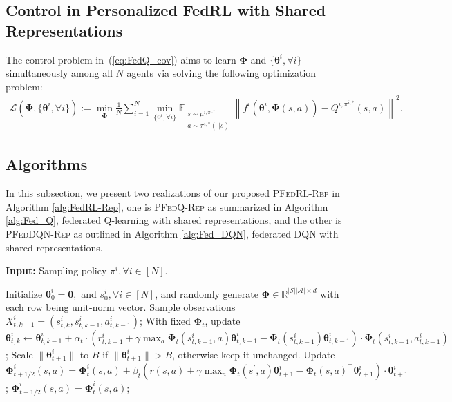 \documentclass{article} %
\def\eqref#1{equation~\ref{#1}}
\theoremstyle{plain}
\theoremstyle{definition}
\theoremstyle{remark}
\renewcommand{\eqref}[1]{(\ref{#1})}
\newcommand{\cB}{\mathcal{B}}
\newcommand{\cA}{\mathcal{A}}
\newcommand{\cS}{\mathcal{S}}
\newcommand{\cL}{\mathcal{L}}
\newcommand{\cC}{\mathcal{C}}
\newcommand{\cD}{\mathcal{D}}
\def\cA{{\mathcal{A}}} \def\cB{{\mathcal{B}}} \def\cC{{\mathcal{C}}} \def\cD{{\mathcal{D}}}
\newcommand{\FedRL}{\textsc{PFedRL-Rep}\xspace}
\begin{document}
{\subsection{Control in Personalized FedRL with Shared Representations}

The control problem in~\eqref{eq:FedQ_cov} aims to learn $\pmb{\Phi}$ and $\{\pmb{\theta}^i,\forall i\}$ simultaneously among all $N$ agents via solving the following optimization problem: 
\begin{align}
\cL(\pmb{\Phi}, \{\pmb{\theta}^i, \forall i\}) := \min_{\pmb{\Phi}} \frac{1}{N}\sum_{i=1}^N \min_{\{\pmb{\theta}^i,\forall i\}} \mathbb{E}_{\substack{s\sim\mu^{i,\pi^{i,*}}\\a\sim\pi^{i,*}(\cdot|s)}}\left\|f^i(\pmb{\theta}^i, \pmb{\Phi}(s,a))-Q^{i,\pi^{i,*}}(s,a)\right\|^2.
\end{align} 

\subsection{Algorithms}\label{alg:app}

In this subsection, we present two realizations of our proposed \FedRL in Algorithm \ref{alg:FedRL-Rep},
one is \textsc{PFedQ-Rep} as summarized in Algorithm \ref{alg:Fed_Q}, federated Q-learning with shared representations, and the other is \textsc{PFedDQN-Rep} as outlined in Algorithm \ref{alg:Fed_DQN}, federated DQN with shared representations.  





\begin{algorithm}[h]
\caption{\textsc{PFedQ-Rep}} 
	\label{alg:Fed_Q}
	\textbf{Input:} Sampling policy $\pi^i, \forall i\in[N]$.
	\begin{algorithmic}[1]
  \STATE Initialize $\pmb{\theta}_0^i=\pmb{0}, $ and $s_0^i,\forall i\in[N]$, and randomly generate $\pmb{\Phi}\in\mathbb{R}^{|\cS||\cA|\times d}$  with each row being unit-norm vector.
        \STATE Sample observations $X_{t, k-1}^i=(s_{t,k}^i, s_{t, k-1}^i, a^i_{t, k-1})$;
         \STATE With fixed $\pmb{\Phi}_t$, update $\pmb{\theta}_{t, k}^i\leftarrow \pmb{\theta}_{t,k-1}^i+\alpha_t\cdot(r_{t,k-1}^i+\gamma\max_a \pmb{\Phi}_t(s_{t, k+1}^i, a)\pmb{\theta}_{t,k-1}^i-\pmb{\Phi}_t(s_{t, k-1}^i)\pmb{\theta}_{t, k-1}^i)\cdot\pmb{\Phi}_t(s_{t,k-1}^i, a_{t, k-1}^i)$;
         \ENDFOR
         \STATE Scale $\|\pmb{\theta}_{t+1}^i\|$ to $B$ if  $\|\pmb{\theta}_{t+1}^i\|>B$, otherwise keep it unchanged.
        \STATE  Update $\pmb{\Phi}^i_{t+1/2}(s,a) = \pmb{\Phi}_t^i(s,a)+\beta_t(r(s,a)+\gamma\max_a \pmb{\Phi}_t(s^\prime,a)\pmb{\theta}_{t+1}^i-\pmb{\Phi}_t(s,a)^\intercal\pmb{\theta}_{t+1}^i)\cdot\pmb{\theta}_{t+1}^i$;
        \ELSE
        \STATE $\pmb{\Phi}^i_{t+1/2}(s,a) = \pmb{\Phi}_{t}^i(s,a)$;


\end{algorithmic}
\end{algorithm}}
\end{document}
